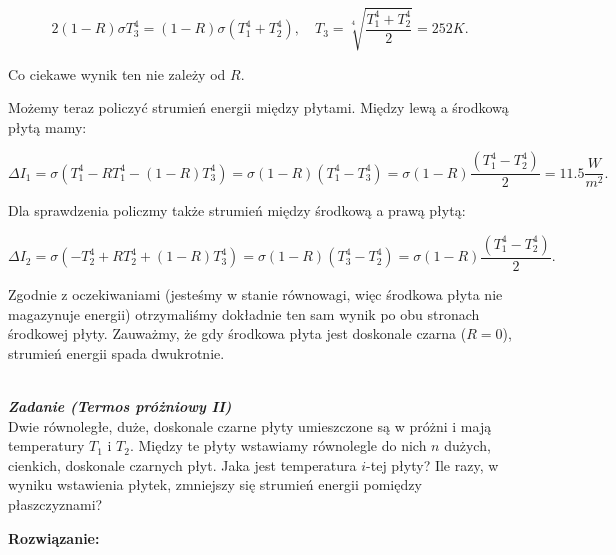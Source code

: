 \documentclass[11pt,a4paper]{article}
\newcounter{zadanie}\newcommand{\zadanie}[1][]{\addtocounter{zadanie}{1} ~\\  {\bf \emph{Zadanie \arabic{zadanie} #1 }} \\}
\begin{document}
\begin{equation}
2(1-R) \sigma T_3^4 = (1-R) \sigma (T_1^4+T_2^4), \quad T_3 = \sqrt[4]{\frac{T_1^4+T_2^4}{2}}= 252 K.
\end{equation}

Co ciekawe wynik ten nie zależy od $R$.

Możemy teraz policzyć strumień energii między płytami. Między lewą a środkową płytą mamy:

\begin{equation}
  \Delta I_1 = \sigma (  T_1^4- R T_1^4 - (1-R)T_3^4) = \sigma (1-R) (T_1^4-T_3^4) =
  \sigma(1-R) \frac{(T_1^4-T_2^4)}{2} = 11.5 \frac{W}{m^2}.
\end{equation}

Dla sprawdzenia policzmy także strumień między środkową a prawą płytą:

\begin{equation}
  \Delta I_2 = \sigma (  -T_2^4 + R T_2^4 + (1-R)T_3^4) =
  \sigma (1-R) (T_3^4-T_2^4) = \sigma(1-R) \frac{(T_1^4-T_2^4)}{2}.
\end{equation}

Zgodnie z oczekiwaniami (jesteśmy w stanie równowagi, więc środkowa płyta nie magazynuje energii)
otrzymaliśmy dokładnie ten sam wynik po obu stronach środkowej płyty. Zauważmy, że gdy środkowa płyta
jest doskonale czarna ($R=0$), strumień energii spada dwukrotnie.

\newpage
\zadanie [(Termos próżniowy II)]
Dwie równoległe, duże, doskonale czarne płyty umieszczone są w próżni i mają temperatury $T_1$ i $T_2$.
Między te płyty wstawiamy równolegle do nich $n$ dużych, cienkich, doskonale czarnych płyt.
Jaka jest temperatura $i$-tej płyty? 
Ile razy, w wyniku wstawienia płytek, zmniejszy się strumień energii pomiędzy płaszczyznami? 

\vskip 10pt
\textbf{Rozwiązanie:}\\


\end{document}
